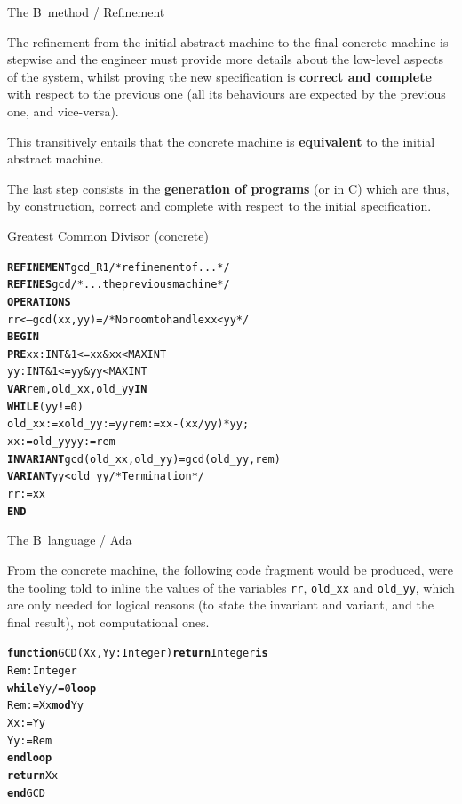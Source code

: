 \documentclass[compress,dvips,xcolor={dvipsnames},t]{beamer}
\begin{document}
%
\begin{frame}{The B~method / Refinement}

  The refinement from the initial abstract machine to the final
  concrete machine is stepwise and the engineer must provide more
  details about the low\hyp{}level aspects of the system, whilst
  proving the new specification is \textbf{correct and complete} with
  respect to the previous one (all its behaviours are expected by the
  previous one, and vice\hyp{}versa).

  \bigskip

  This transitively entails that the concrete machine is
  \textbf{equivalent} to the initial abstract machine.

  \bigskip

  The last step consists in the \textbf{generation of \Ada programs}
  (or in \textsf{C}) which are thus, by construction, correct and
  complete with respect to the initial specification.

\end{frame}

%
\begin{frame}[fragile]{Greatest Common Divisor (concrete)}

\begin{alltt}
\small
\textbf{REFINEMENT} gcd_R1 /* refinement of ...        */
\textbf{REFINES} gcd       /* ... the previous machine */
\textbf{OPERATIONS}
 rr <-- gcd (xx,yy) = /* No room to handle xx < yy */
   \textbf{BEGIN}
     \textbf{PRE} xx : INT \& 1 <= xx \& xx < MAXINT
         yy : INT \& 1 <= yy \& yy < MAXINT
     \textbf{VAR} rem, old_xx, old_yy \textbf{IN}
     \textbf{WHILE} (yy != 0)
       old_xx := xold_yy := yyrem := xx-(xx/yy)*yy;
       xx := old_yyyy := rem
     \textbf{INVARIANT} gcd (old_xx, old_yy) = gcd (old_yy, rem)
     \textbf{VARIANT} yy < old_yy /* Termination */
     rr := xx
   \textbf{END}
\end{alltt}

\end{frame}

%
\begin{frame}[fragile]{The B~language / Ada}

  From the concrete machine, the following \Ada code fragment would be
  produced, were the tooling told to inline the values of the
  variables \texttt{\small rr}, \texttt{\small old\_xx} and
  \texttt{\small old\_yy}, which are only needed for logical reasons
  (to state the invariant and variant, and the final result), not
  computational ones.
\begin{alltt}
\small
\textbf{function} GCD (Xx, Yy : Integer) \textbf{return} Integer \textbf{is}
  Rem : Integer
  \textbf{while} Yy /= 0 \textbf{loop}
    Rem := Xx \textbf{mod} Yy
    Xx := Yy
    Yy := Rem
  \textbf{end loop}
  \textbf{return} Xx
\textbf{end} GCD
\end{alltt}

\end{frame}
\end{document}
